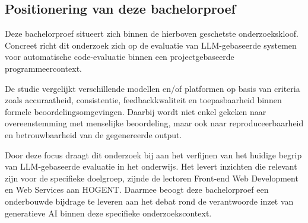 \vspace{1em}

\subsection{Positionering van deze bachelorproef}

Deze bachelorproef situeert zich binnen de hierboven geschetste onderzoekskloof. Concreet richt dit onderzoek zich op de evaluatie van LLM-gebaseerde systemen voor automatische code-evaluatie binnen een projectgebaseerde programmeercontext.

\vspace{1em}

De studie vergelijkt verschillende modellen en/of platformen op basis van criteria zoals accuraatheid, consistentie, feedbackkwaliteit en toepasbaarheid binnen formele beoordelingsomgevingen. Daarbij wordt niet enkel gekeken naar overeenstemming met menselijke beoordeling, maar ook naar reproduceerbaarheid en betrouwbaarheid van de gegenereerde output.

\vspace{1em}

Door deze focus draagt dit onderzoek bij aan het verfijnen van het huidige begrip van LLM-gebaseerde evaluatie in het onderwijs. Het levert inzichten die relevant zijn voor de specifieke doelgroep, zijnde de lectoren Front-end Web Development en Web Services aan HOGENT. Daarmee beoogt deze bachelorproef een onderbouwde bijdrage te leveren aan het debat rond de verantwoorde inzet van generatieve AI binnen deze specifieke onderzoekscontext.
